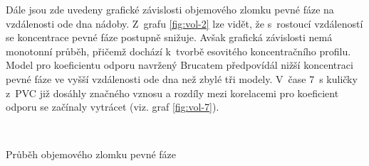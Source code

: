 Dále jsou zde uvedeny grafické závislosti objemového zlomku pevné fáze na vzdá\-le\-nosti ode dna nádoby. Z~grafu \ref{fig:vol-2} lze vidět, že s~rostoucí vzdáleností se koncentrace pevné fáze postupně snižuje. Avšak grafická závislosti nemá monotonní průběh, přičemž dochází k~tvorbě esovitého koncentračního profilu. Model pro koeficientu odporu navržený Brucatem předpovídál nižší koncentraci pevné fáze ve vyšší vzdálenosti ode dna než zbylé tři modely. V~čase \SI{7}{\second} kuličky z~PVC již dosáhly značného vznosu a rozdíly mezi korelacemi pro koeficient odporu se začínaly vytrácet (viz. graf \ref{fig:vol-7}).
\begin{grf}[h!]
 \centering
  \\ 
  \caption{Průběh objemového zlomku pevné fáze}
  \label{fig:vol}
\end{grf}
\newpage


